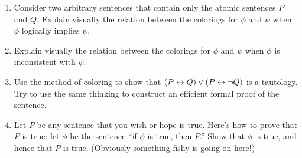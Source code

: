 


\begin{exercises} \mbox{}
  \begin{enumerate}
  \item Consider two arbitrary sentences that contain only the atomic
    sentences $P$ and $Q$.  Explain visually the relation between the
    colorings for $\phi$ and $\psi$ when $\phi$ logically implies
    $\psi$. 
\item Explain visually the relation between the colorings for $\phi$
  and $\psi$ when $\phi$ is inconsistent with $\psi$.
\item Use the method of coloring to show that
  $(P\leftrightarrow Q)\vee (P\leftrightarrow \neg Q)$ is a tautology.  Try to use the same
  thinking to construct an efficient formal proof of the sentence.
\item Let $P$ be any sentence that you wish or hope is true.  Here's
  how to prove that $P$ is true: let $\phi$ be the sentence ``if
  $\phi$ is true, then $P$.''  Show that $\phi$ is true, and hence
  that $P$ is true.  (Obviously something fishy is going on
  here!)  \end{enumerate} \end{exercises}


